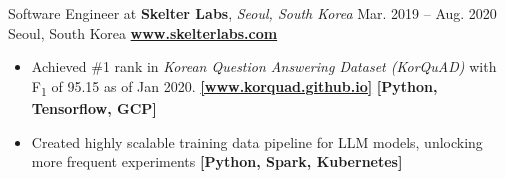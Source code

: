 \cveventflat
{Software Engineer at }
{\textbf{Skelter Labs}, \textit{Seoul, South Korea}}
{Mar. 2019 -- Aug. 2020}
{Seoul, South Korea}
\newline
\href{https://www.skelterlabs.com/}{\textbf{www.skelterlabs.com}}
\begin{itemize}
    \item {
        Achieved \#1 rank in \textit{Korean Question Answering Dataset (KorQuAD)}
        with F\textsubscript{1} of 95.15 as of Jan 2020.
    }
    \href{https://korquad.github.io/}{\textbf{[www.korquad.github.io]}}
    \textbf{[Python, Tensorflow, GCP]}
    \item Created highly scalable training data pipeline for LLM models, unlocking more frequent experiments
    \textbf{[Python, Spark, Kubernetes]}
\end{itemize}
